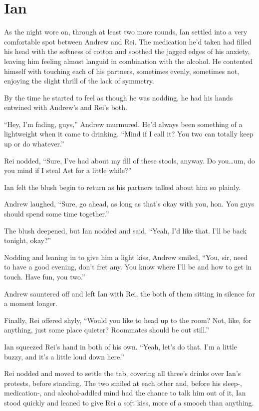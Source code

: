 \chapter{Ian}

As the night wore on, through at least two more rounds, Ian settled into a very comfortable spot between Andrew and Rei. The medication he'd taken had filled his head with the softness of cotton and soothed the jagged edges of his anxiety, leaving him feeling almost languid in combination with the alcohol. He contented himself with touching each of his partners, sometimes evenly, sometimes not, enjoying the slight thrill of the lack of symmetry.

By the time he started to feel as though he was nodding, he had his hands entwined with Andrew's and Rei's both.

``Hey, I'm fading, guys,'' Andrew murmured. He'd always been something of a lightweight when it came to drinking. ``Mind if I call it? You two can totally keep up or do whatever.''

Rei nodded, ``Sure, I've had about my fill of these stools, anyway. Do you\ldots{}um, do you mind if I steal Ast for a little while?''

Ian felt the blush begin to return as his partners talked about him so plainly.

Andrew laughed, ``Sure, go ahead, as long as that's okay with you, hon. You guys should spend some time together.''

The blush deepened, but Ian nodded and said, ``Yeah, I'd like that. I'll be back tonight, okay?''

Nodding and leaning in to give him a light kiss, Andrew smiled, ``You, sir, need to have a good evening, don't fret any. You know where I'll be and how to get in touch. Have fun, you two.''

Andrew sauntered off and left Ian with Rei, the both of them sitting in silence for a moment longer.

Finally, Rei offered shyly, ``Would you like to head up to the room? Not, like, for anything, just some place quieter? Roommates should be out still.''

Ian squeezed Rei's hand in both of his own. ``Yeah, let's do that. I'm a little buzzy, and it's a little loud down here.''

Rei nodded and moved to settle the tab, covering all three's drinks over Ian's protests, before standing. The two smiled at each other and, before his sleep-, medication-, and alcohol-addled mind had the chance to talk him out of it, Ian stood quickly and leaned to give Rei a soft kiss, more of a smooch than anything.

